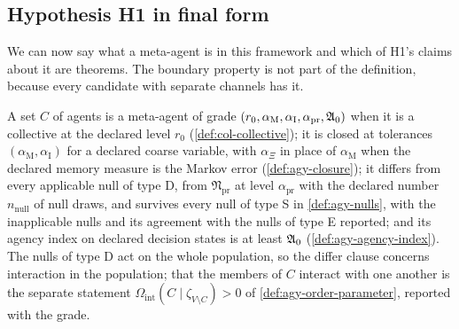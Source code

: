 \subsection{Hypothesis H1 in final form}\label{sec:agy-h1}

We can now say what a meta-agent is in this framework and which of H1's claims about it are theorems. The boundary property is not part of the definition, because every candidate with separate channels has it.

\begin{definition}\label{def:agy-meta-agent}
A set $C$ of agents is a meta-agent of grade $(r_0,\alpha_{\mathrm M},\alpha_{\mathrm I},\alpha_{\mathrm{pr}},\mathfrak{A}_0)$ when it is a collective at the declared level $r_0$ (\cref{def:col-collective}); it is closed at tolerances $(\alpha_{\mathrm M},\alpha_{\mathrm I})$ for a declared coarse variable, with $\alpha_\Xi$ in place of $\alpha_{\mathrm M}$ when the declared memory measure is the Markov error (\cref{def:agy-closure}); it differs from every applicable null of type D, from $\mathfrak N_{\mathrm{pr}}$ at level $\alpha_{\mathrm{pr}}$ with the declared number $n_{\mathrm{null}}$ of null draws, and survives every null of type S in \cref{def:agy-nulls}, with the inapplicable nulls and its agreement with the nulls of type E reported; and its agency index on declared decision states is at least $\mathfrak{A}_0$ (\cref{def:agy-agency-index}). The nulls of type D act on the whole population, so the differ clause concerns interaction in the population; that the members of $C$ interact with one another is the separate statement $\Omega_{\mathrm{int}}(C\mid\zeta_{V\setminus C})>0$ of \cref{def:agy-order-parameter}, reported with the grade.
\end{definition}

